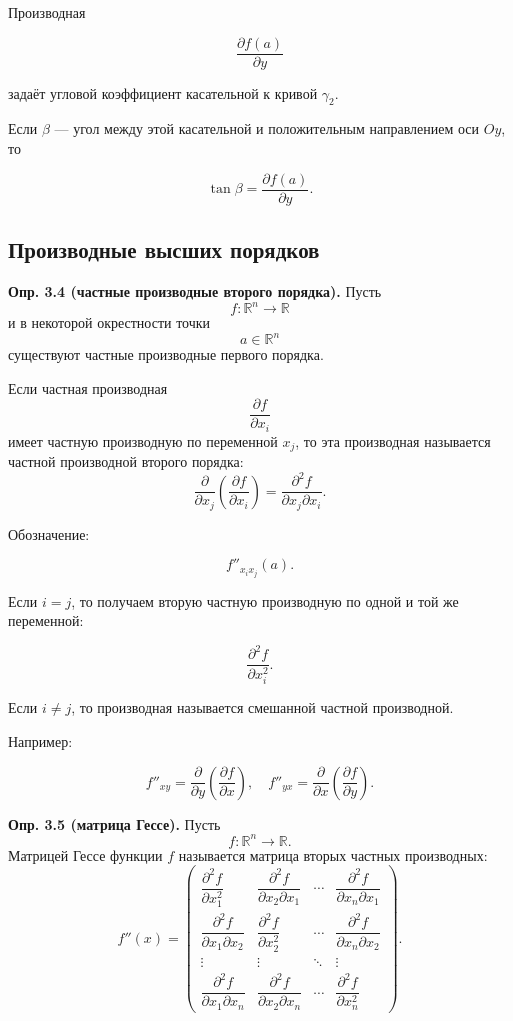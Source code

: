 \documentclass[a4paper,12pt]{article}
\begin{document}
Производная

\[
\frac{\partial f(a)}{\partial y}
\]

задаёт угловой коэффициент касательной к кривой $\gamma_2$.

Если $\beta$ — угол между этой касательной и положительным направлением оси $Oy$, то

\[
\tan\beta
=
\frac{\partial f(a)}{\partial y}.
\]

\subsection*{Производные высших порядков}

\begin{definitionbox}
\textbf{Опр. 3.4 (частные производные второго порядка).}
Пусть
\[
f:\mathbb{R}^n\to\mathbb{R}
\]
и в некоторой окрестности точки
\[
a\in\mathbb{R}^n
\]
существуют частные производные первого порядка.

Если частная производная
\[
\frac{\partial f}{\partial x_i}
\]
имеет частную производную по переменной $x_j$, то эта производная называется частной производной второго порядка:
\[
\frac{\partial}{\partial x_j}
\left(
\frac{\partial f}{\partial x_i}
\right)
=
\frac{\partial^2 f}{\partial x_j\partial x_i}.
\]
\end{definitionbox}

Обозначение:

\[
f''_{x_i x_j}(a).
\]

Если $i=j$, то получаем вторую частную производную по одной и той же переменной:

\[
\frac{\partial^2 f}{\partial x_i^2}.
\]

Если $i\ne j$, то производная называется смешанной частной производной.

Например:

\[
f''_{xy}
=
\frac{\partial}{\partial y}
\left(
\frac{\partial f}{\partial x}
\right),
\quad
f''_{yx}
=
\frac{\partial}{\partial x}
\left(
\frac{\partial f}{\partial y}
\right).
\]

\begin{definitionbox}
\textbf{Опр. 3.5 (матрица Гессе).}
Пусть
\[
f:\mathbb{R}^n\to\mathbb{R}.
\]
Матрицей Гессе функции $f$ называется матрица вторых частных производных:
\[
f''(x)
=
\begin{pmatrix}
\dfrac{\partial^2 f}{\partial x_1^2}
&
\dfrac{\partial^2 f}{\partial x_2\partial x_1}
&
\cdots
&
\dfrac{\partial^2 f}{\partial x_n\partial x_1}
\\[8pt]
\dfrac{\partial^2 f}{\partial x_1\partial x_2}
&
\dfrac{\partial^2 f}{\partial x_2^2}
&
\cdots
&
\dfrac{\partial^2 f}{\partial x_n\partial x_2}
\\
\vdots
&
\vdots
&
\ddots
&
\vdots
\\[4pt]
\dfrac{\partial^2 f}{\partial x_1\partial x_n}
&
\dfrac{\partial^2 f}{\partial x_2\partial x_n}
&
\cdots
&
\dfrac{\partial^2 f}{\partial x_n^2}
\end{pmatrix}.
\]
\end{definitionbox}
\end{document}

